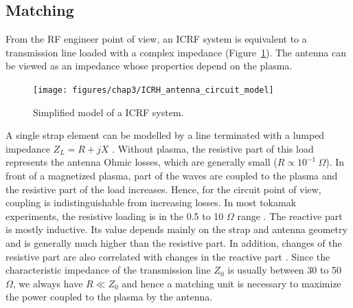 \subsection{Matching}\label{sec:ICRH_matching_systems}
From the RF engineer point of view, an ICRF system is equivalent to a transmission line loaded with a complex impedance (Figure~\ref{fig:icrhantennacircuitmodel}). The antenna can be viewed as an impedance whose properties depend on the plasma. 

\begin{figure}[h]
	\centering
	\texttt{[image: figures/chap3/ICRH\_antenna\_circuit\_model]}
	\caption{Simplified model of a ICRF system.}
	\label{fig:icrhantennacircuitmodel}
\end{figure}

A single strap element can be modelled by a line terminated with a lumped impedance $Z_L = R + j X$ . Without plasma, the resistive part of this load represents the antenna Ohmic losses, which are generally small ($R \propto 10^{-1}~\si{\Omega}$). In front of a magnetized plasma, part of the waves are coupled to the plasma and the resistive part of the load increases. Hence, for the circuit point of view, coupling is indistinguishable from increasing losses. In most tokamak experiments, the resistive loading is in the 0.5 to 10 $\si{\Omega}$ range . The reactive part is mostly inductive. Its value depends mainly on the strap and antenna geometry and is generally much higher than the resistive part. In addition, changes of the resistive part are also correlated with changes in the reactive part . Since the characteristic impedance of the transmission line $Z_0$ is usually between 30 to 50~$\si{\Omega}$, we always have $R \ll Z_0$ and hence a matching unit is necessary to maximize the power coupled to the plasma by the antenna.

